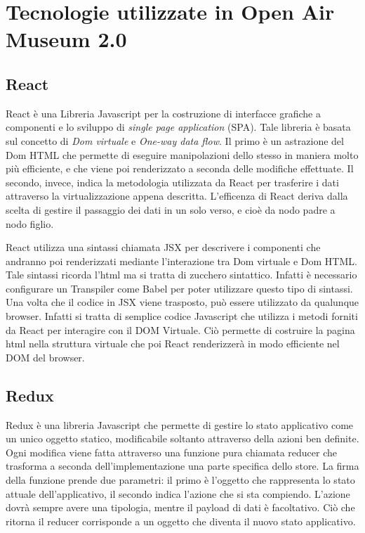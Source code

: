 \section{Tecnologie utilizzate in Open Air Museum 2.0}\vspace{5mm}

	\subsection{React}\vspace{5mm}

React\cite{React} è una Libreria Javascript per la costruzione di interfacce grafiche a componenti e lo sviluppo di \emph{single page application} (SPA). Tale libreria è basata sul concetto di \emph{Dom virtuale} e \emph{One-way data flow}. Il primo è un astrazione del Dom HTML che permette di eseguire manipolazioni dello stesso in maniera molto più efficiente, e che viene poi renderizzato a seconda delle modifiche effettuate. Il secondo, invece, indica la metodologia utilizzata da React per trasferire i dati attraverso la virtualizzazione appena descritta. L'efficenza di React deriva dalla scelta di gestire il passaggio dei dati in un solo verso, e cioè da nodo padre a nodo figlio.\vspace{5mm}

React utilizza una sintassi chiamata JSX per descrivere i componenti che andranno poi renderizzati mediante l'interazione tra Dom virtuale e Dom HTML. Tale sintassi ricorda l'html ma si tratta di zucchero sintattico. Infatti è necessario configurare un Transpiler come Babel per poter utilizzare questo tipo di sintassi. Una volta che il codice in JSX viene trasposto, può essere utilizzato da qualunque browser. Infatti si tratta di semplice codice Javascript che utilizza i metodi forniti da React per interagire con il DOM Virtuale. Ciò permette di costruire la pagina html nella struttura virtuale che poi React renderizzerà in modo efficiente nel DOM del browser.


	\subsection{Redux}\vspace{5mm}
	
	Redux è una libreria Javascript che permette di gestire lo stato applicativo come un unico oggetto statico, modificabile soltanto attraverso della azioni ben definite. Ogni modifica viene fatta attraverso una funzione pura\cite{PureFunction} chiamata reducer che trasforma a seconda dell'implementazione una parte specifica dello store. La firma della funzione prende due parametri: il primo è l'oggetto che rappresenta lo stato attuale dell'applicativo, il secondo indica l'azione che si sta compiendo. L'azione dovrà sempre avere una tipologia, mentre il payload di dati è facoltativo. Ciò che ritorna il reducer corrisponde a un oggetto che diventa il nuovo stato applicativo.\vspace{5mm}
	
